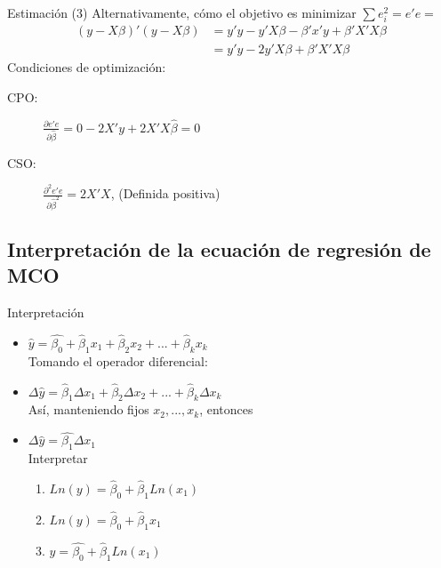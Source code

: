 \begin{frame}{Estimación (3)}
	Alternativamente, cómo el objetivo es minimizar $\sum e_i^2=e'e=$
	\begin{align*}
		(y-X\beta)'(y-X\beta) & = y'y-y'X\beta-\beta'x'y+\beta'X'X\beta \\
		& = y'y-2y'X\beta+\beta'X'X\beta
	\end{align*}
	Condiciones de optimización:
	\bigskip
	\begin{description}
		\item[CPO:] $\frac{\partial e'e}{\partial\widehat{\beta}}=0-2X'y+2X'X\widehat{\beta}=0$
		\item[CSO:] $\frac{\partial^2 e'e}{\partial\widehat{\beta}^2}=2X'X$, (Definida positiva)
	\end{description}
\end{frame}

\subsection{Interpretación de la ecuación de regresión de MCO}
\begin{frame}{Interpretación}
	\begin{itemize}
		\item $\hat{y}=\hat{\beta_{0}}+\hat\beta_{1}x_{1}+\hat\beta_{2}x_{2}+...+\hat\beta_{k}x_{k}$\\
		Tomando el operador diferencial:
		\item $\Delta\hat{y}=\hat\beta_{1}\Delta x_{1}+\hat\beta_{2}\Delta x_{2}+...+\hat\beta_{k}\Delta x_{k}$ \\
		Así, manteniendo fijos $x_{2},...,x_{k}$, entonces
		\item $\Delta\hat{y}=\hat{\beta_{1}}\Delta x_{1}$\\
		Interpretar
		\bigskip
		\begin{enumerate}
			\item $Ln(y)=\hat\beta_{0}+\hat\beta_{1} Ln(x_{1})$
			\item $Ln(y)=\hat\beta_{0}+\hat\beta_{1} x_{1}$
			\item $y=\hat{\beta_{0}}+\hat\beta_{1} Ln(x_{1})$
		\end{enumerate}
	\end{itemize}
\end{frame}

